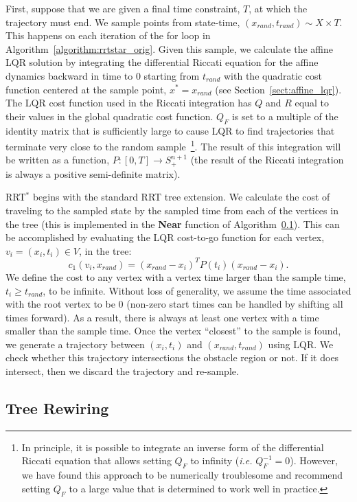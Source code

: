 \documentclass[letterpaper, 10pt, english, conference]{IEEEtran}
\begin{document}
First, suppose that we are given a final time constraint, $T$, at
which the trajectory must end. We sample points from state-time,
$(x_{rand}, t_{rand}) \sim X \times T$. This happens on each iteration
of the {\sc for} loop in Algorithm~\ref{algorithm:rrtstar_orig}. Given
this sample, we calculate the affine LQR solution by integrating the
differential Riccati equation for the affine dynamics backward in time
to $0$ starting from $t_{rand}$ with the quadratic cost function
centered at the sample point, $x^* = x_{rand}$ (see
Section~\ref{sect:affine_lqr}). The LQR cost function used in the
Riccati integration has $Q$ and $R$ equal to their values in the
global quadratic cost function. $Q_F$ is set to a multiple of the
identity matrix that is sufficiently large to cause LQR to find
trajectories that terminate very close to the random
sample~\footnote{In principle, it is possible to integrate an inverse
  form of the differential Riccati equation that allows setting $Q_F$
  to infinity ({\em i.e.} $Q_F^{-1} = 0$). However, we have found this
  approach to be numerically troublesome and recommend setting $Q_F$
  to a large value that is determined to work well in practice.}. The
result of this integration will be written as a function, $P: [0,T]
\to S^{n+1}_{+}$ (the result of the Riccati integration is always a
positive semi-definite matrix).

RRT$^*$ begins with the standard RRT tree extension. We calculate the
cost of traveling to the sampled state by the sampled time from each
of the vertices in the tree (this is implemented in the {\bf Near}
function of Algorithm~\ref{}). This can be accomplished by evaluating
the LQR cost-to-go function for each vertex, $v_i = (x_i, t_i) \in V$,
in the tree:
\[
c_1(v_i,x_{rand}) = (x_{rand} - x_i)^T P(t_i) (x_{rand} - x_i).
\]
We define the cost to any vertex with a vertex time larger than the
sample time, $t_i \geq t_{rand}$, to be infinite. Without loss of
generality, we assume the time associated with the root vertex to be
$0$ (non-zero start times can be handled by shifting all times
forward). As a result, there is always at least one vertex with a time
smaller than the sample time. Once the vertex ``closest'' to the
sample is found, we generate a trajectory between $(x_i, t_i)$ and
$(x_{rand}, t_{rand})$ using LQR. We check whether this trajectory
intersections the obstacle region or not. If it does intersect, then
we discard the trajectory and re-sample.


\subsection{Tree Rewiring}
\end{document}

